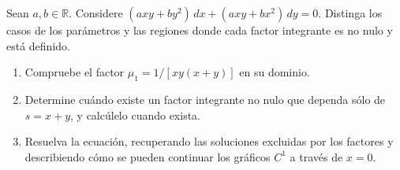 Sean $a,b\in\mathbb R$. Considere $(axy+by^2)\,dx+(axy+bx^2)\,dy=0$. Distinga los casos de los parámetros y las regiones donde cada factor integrante es no nulo y está definido.

\begin{enumerate}[label=(\alph*),ref=\alph*,leftmargin=*]
\item Compruebe el factor $\mu_1=1/[xy(x+y)]$ en su dominio.
\item Determine cuándo existe un factor integrante no nulo que dependa sólo de $s=x+y$, y calcúlelo cuando exista.
\item Resuelva la ecuación, recuperando las soluciones excluidas por los factores y describiendo cómo se pueden continuar los gráficos $C^1$ a través de $x=0$.
\end{enumerate}
